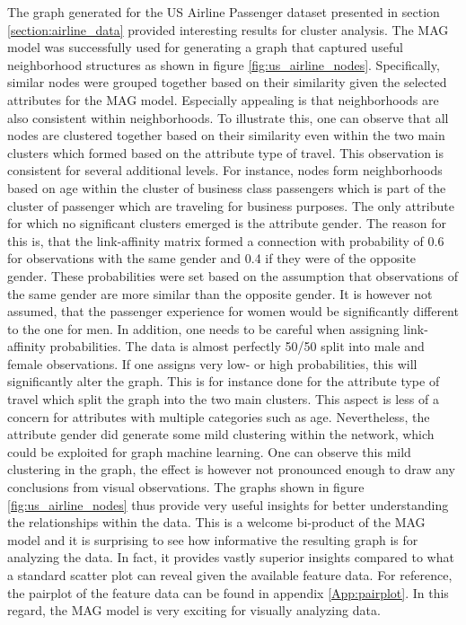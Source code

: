   The graph generated for the US Airline Passenger dataset presented in section
  \ref{section:airline_data} provided interesting results for cluster analysis. 
  The MAG model was successfully used for generating a graph that captured 
  useful neighborhood structures as shown in figure \ref{fig:us_airline_nodes}. 
  Specifically, similar nodes were grouped together based on their similarity 
  given the selected attributes for the MAG model. Especially appealing is that 
  neighborhoods are also consistent within neighborhoods. To illustrate this, 
  one can observe that all nodes are clustered together based on their 
  similarity even within the two main clusters which formed based on the 
  attribute type of travel. This observation is consistent for several 
  additional levels. For instance, nodes form neighborhoods based on age within 
  the cluster of business class passengers which is part of the cluster of 
  passenger which are traveling for business purposes. The only attribute for 
  which no significant clusters emerged is the attribute gender. The reason for 
  this is, that the link-affinity matrix formed a connection with probability 
  of 0.6 for observations with the same gender and 0.4 if they were of the 
  opposite gender. These probabilities were set based on the assumption that
  observations of the same gender are more similar than the opposite gender. It
  is however not assumed, that the passenger experience for women would be
  significantly different to the one for men. In addition, one needs to be
  careful when assigning link-affinity probabilities. The data is almost
  perfectly 50/50 split into male and female observations. If one assigns very
  low- or high probabilities, this will significantly alter the graph. This is 
  for instance done for the attribute type of travel which split the graph into
  the two main clusters. This aspect is less of a concern for attributes with 
  multiple categories such as age. Nevertheless, the attribute gender did 
  generate some mild clustering within the network, which could be exploited for 
  graph machine learning. One can observe this mild clustering in the graph, the 
  effect is however not pronounced enough to draw any conclusions from visual 
  observations. The graphs shown in figure \ref{fig:us_airline_nodes} thus 
  provide very useful insights for better understanding the relationships within 
  the data. This is a welcome bi-product of the MAG model and it is surprising 
  to see how informative the resulting graph is for analyzing the data. In fact, 
  it provides vastly superior insights compared to what a standard scatter plot 
  can reveal given the available feature data. For reference, the pairplot of 
  the feature data can be found in appendix \ref{App:pairplot}. In this regard, 
  the MAG model is very exciting for visually analyzing data. \\

